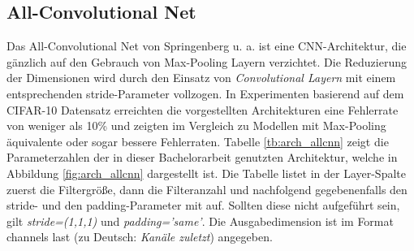 \subsection{All-Convolutional Net}
Das All-Convolutional Net von Springenberg u. a. \parencite{DBLP:journals/corr/SpringenbergDBR14} ist eine CNN-Architektur, die gänzlich auf den Gebrauch von Max-Pooling Layern verzichtet. Die Reduzierung der Dimensionen wird durch den Einsatz von \textit{Convolutional Layern} mit einem entsprechenden stride-Parameter vollzogen. In Experimenten basierend auf dem CIFAR-10 Datensatz erreichten die vorgestellten Architekturen eine Fehlerrate von weniger als 10\% und zeigten im Vergleich zu Modellen mit Max-Pooling äquivalente oder sogar bessere Fehlerraten. Tabelle \ref{tb:arch_allcnn} zeigt die Parameterzahlen der in dieser Bachelorarbeit genutzten Architektur, welche in Abbildung \ref{fig:arch_allcnn} dargestellt ist. Die Tabelle listet in der Layer-Spalte zuerst die Filtergröße, dann die Filteranzahl und nachfolgend gegebenenfalls den stride- und den padding-Parameter mit auf. Sollten diese nicht aufgeführt sein, gilt \textit{stride=(1,1,1)} und \textit{padding='same'}. Die Ausgabedimension ist im Format channels last (zu Deutsch: \textit{Kanäle zuletzt}) angegeben. 

